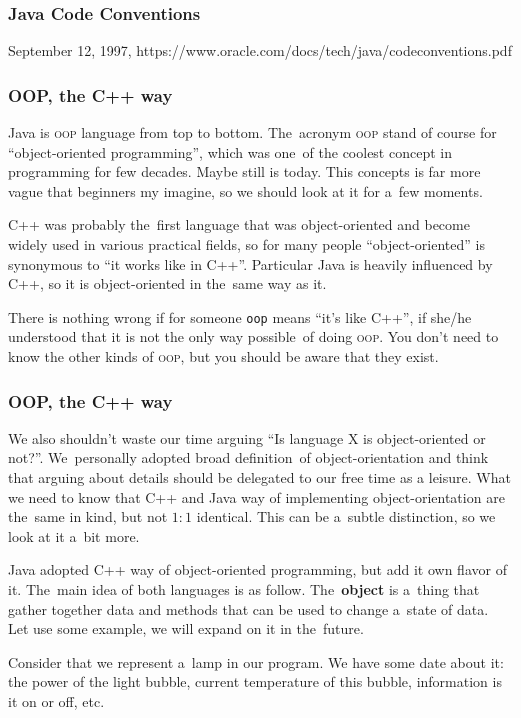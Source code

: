 \documentclass[10pt,t]{beamer}
\begin{document}
\begin{frame}
  \frametitle{Java Code Conventions}


  September 12, 1997,
  https://www.oracle.com/docs/tech/java/codeconventions.pdf

\end{frame}





\begin{frame}
  \frametitle{OOP, the C++ way}


  Java is
  {\textsc{oop}} language from top to bottom. The~acronym \textsc{oop}
  stand of course for ``object-oriented programming'', which was one~of
  the coolest concept in programming for few decades. Maybe still is today.
  This concepts is far more vague that beginners my imagine, so we should
  look at it for a~few moments.

  C++ was probably the~first language that was object-oriented and become
  widely used in various practical fields, so for many people
  ``object-oriented'' is synonymous to ``it works like in C++''. Particular
  Java is heavily influenced by C++, so it is object-oriented in the~same
  way as it.

  There is nothing wrong if for someone \texttt{oop} means ``it's like
  C++'', if she/he understood that it is not the only way possible~of
  doing \textsc{oop}. You don't need to know the other kinds of
  \textsc{oop}, but you should be aware that they exist.

\end{frame}





\begin{frame}
  \frametitle{OOP, the C++ way}


  We also shouldn't waste our time arguing ``Is language X is
  object-oriented or not?''. We~personally adopted broad definition~of
  object-orientation and think that arguing about details should be
  delegated to our free time as a leisure. What we need to know that C++
  and Java way of implementing object-orientation are the~same in kind, but
  not $1:1$ identical. This can be a~subtle distinction, so we look at it
  a~bit more.

  Java adopted C++ way of object-oriented programming, but add it own flavor
  of it. The~main idea of both languages is as follow. The~\textbf{object}
  is a~thing that gather together data and methods that can be used to
  change a~state of data. Let use some example, we will expand on it
  in the~future.

  Consider that we represent a~lamp in our program. We have some date
  about it: the power of the light bubble, current temperature of this
  bubble, information is it on or off, etc.

\end{frame}
\end{document}

